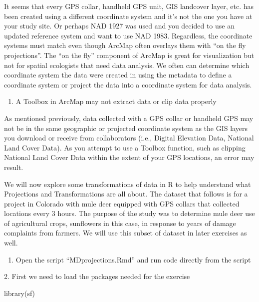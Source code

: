 \documentclass[
  letterpaper,
]{book}
\newenvironment{Shaded}{\begin{snugshade}}{\end{snugshade}}
\newcommand{\FunctionTok}[1]{\textcolor[rgb]{0.28,0.35,0.67}{#1}}
\newcommand{\NormalTok}[1]{\textcolor[rgb]{0.00,0.23,0.31}{#1}}
\providecommand{\tightlist}{%
  \setlength{\itemsep}{0pt}\setlength{\parskip}{0pt}}\usepackage{longtable,booktabs,array}
\begin{document}
It seems that every GPS collar, handheld GPS unit, GIS landcover layer,
etc. has been created using a different coordinate system and it's not
the one you have at your study site. Or perhaps NAD 1927 was used and
you decided to use an updated reference system and want to use NAD 1983.
Regardless, the coordinate systems must match even though ArcMap often
overlays them with ``on the fly projections''. The ``on the fly''
component of ArcMap is great for visualization but not for spatial
ecologists that need data analysis. We often can determine which
coordinate system the data were created in using the metadata to define
a coordinate system or project the data into a coordinate system for
data analysis.

\begin{enumerate}
\def\labelenumi{\arabic{enumi}.}
\setcounter{enumi}{1}
\tightlist
\item
  A Toolbox in ArcMap may not extract data or clip data properly
\end{enumerate}

As mentioned previously, data collected with a GPS collar or handheld
GPS may not be in the same geographic or projected coordinate system as
the GIS layers you download or receive from collaborators (i.e., Digital
Elevation Data, National Land Cover Data). As you attempt to use a
Toolbox function, such as clipping National Land Cover Data within the
extent of your GPS locations, an error may result.

We will now explore some transformations of data in R to help understand
what Projections and Transformations are all about. The dataset that
follows is for a project in Colorado with mule deer equipped with GPS
collars that collected locations every 3 hours. The purpose of the study
was to determine mule deer use of agricultural crops, sunflowers in this
case, in response to years of damage complaints from farmers. We will
use this subset of dataset in later exercises as well.

\begin{enumerate}
\def\labelenumi{\arabic{enumi}.}
\tightlist
\item
  Open the script ``MDprojections.Rmd'' and run code directly from the
  script
\end{enumerate}

2. First we need to load the packages needed for the exercise

\begin{Shaded}
\begin{Highlighting}[]
\FunctionTok{library}\NormalTok{(sf)}
\end{Highlighting}
\end{Shaded}
\end{document}
